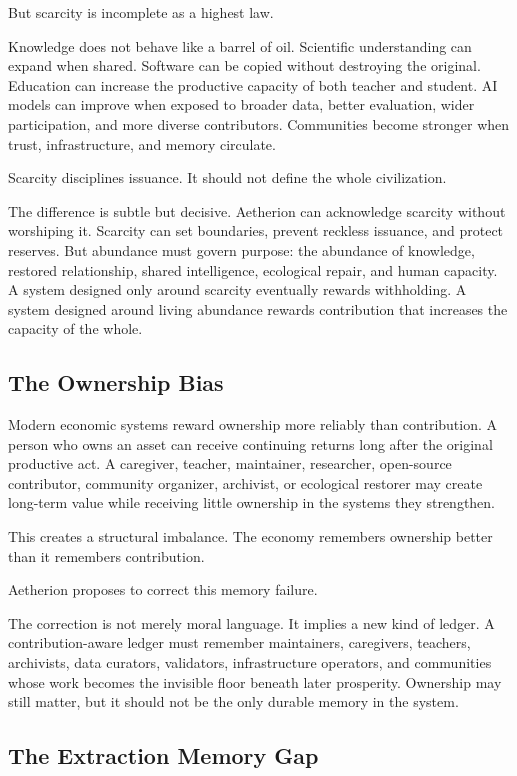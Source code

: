 \documentclass[12pt]{article}
\begin{document}
But scarcity is incomplete as a highest law.

Knowledge does not behave like a barrel of oil. Scientific understanding can expand when shared. Software can be copied without destroying the original. Education can increase the productive capacity of both teacher and student. AI models can improve when exposed to broader data, better evaluation, wider participation, and more diverse contributors. Communities become stronger when trust, infrastructure, and memory circulate.

Scarcity disciplines issuance. It should not define the whole civilization.

The difference is subtle but decisive. Aetherion can acknowledge scarcity without worshiping it. Scarcity can set boundaries, prevent reckless issuance, and protect reserves. But abundance must govern purpose: the abundance of knowledge, restored relationship, shared intelligence, ecological repair, and human capacity. A system designed only around scarcity eventually rewards withholding. A system designed around living abundance rewards contribution that increases the capacity of the whole.

\subsection{The Ownership Bias}

Modern economic systems reward ownership more reliably than contribution. A person who owns an asset can receive continuing returns long after the original productive act. A caregiver, teacher, maintainer, researcher, open-source contributor, community organizer, archivist, or ecological restorer may create long-term value while receiving little ownership in the systems they strengthen.

This creates a structural imbalance. The economy remembers ownership better than it remembers contribution.

Aetherion proposes to correct this memory failure.

The correction is not merely moral language. It implies a new kind of ledger. A contribution-aware ledger must remember maintainers, caregivers, teachers, archivists, data curators, validators, infrastructure operators, and communities whose work becomes the invisible floor beneath later prosperity. Ownership may still matter, but it should not be the only durable memory in the system.

\subsection{The Extraction Memory Gap}
\end{document}
